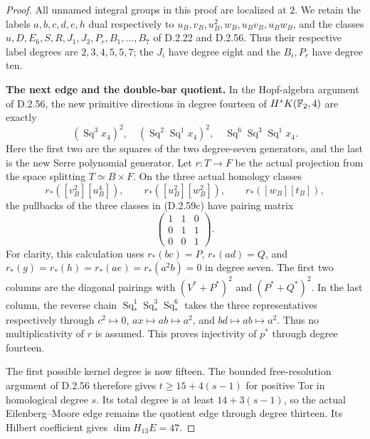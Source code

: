 \begin{proof}
All unnamed integral groups in this proof are localized at $2$.
We retain the labels $a,b,c,d,e,h$ dual respectively to
$u_B,v_B,u_B^2,w_B,u_Bv_B,u_Bw_B$, and the classes
$u,D,E_6,S,R,J_1,J_2,P_r,B_1,\ldots,B_7$ of D.2.22 and
D.2.56.  Thus their respective label degrees are
$2,3,4,5,5,7$; the $J_i$ have degree eight and the $B_i,P_r$
have degree ten.

\textbf{The next edge and the double-bar quotient.}
In the Hopf-algebra argument of D.2.56, the new primitive directions
in degree fourteen of $H^*K(\mathbb F_2,4)$ are exactly
\[
 (\operatorname{Sq}^3x_4)^2,\quad
 (\operatorname{Sq}^2\operatorname{Sq}^1x_4)^2,\quad
 \operatorname{Sq}^6\operatorname{Sq}^3\operatorname{Sq}^1x_4.
 \tag{D.2.59c}
\]
Here the first two are the squares of the two degree-seven
generators, and the last is the new Serre polynomial generator.
Let $r:T\to F$ be the actual projection from the space splitting
$T\simeq B\times F$.  On the three actual homology classes
\[
 r_*([v_B^2][u_B^4]),\qquad
 r_*([u_B^2][w_B^2]),\qquad r_*([w_B][t_B]),
\]
the pullbacks of the three classes in \textup{(D.2.59c)} have
pairing matrix
\[
 \begin{pmatrix}1&1&0\\0&1&1\\0&0&1\end{pmatrix}.
 \tag{D.2.59d}
\]
For clarity, this calculation uses $r_*(bc)=P$, $r_*(ad)=Q$,
and $r_*(g)=r_*(h)=r_*(ae)=r_*(a^2b)=0$ in degree seven.
The first two columns are the diagonal pairings with
$(V^*+P^*)^2$ and $(P^*+Q^*)^2$.  In the last column, the reverse
chain $\operatorname{Sq}_*^1\operatorname{Sq}_*^3
\operatorname{Sq}_*^6$ takes the three representatives respectively
through $c^2\mapsto0$, $ax\mapsto ab\mapsto a^2$, and
$bd\mapsto ab\mapsto a^2$.  Thus no multiplicativity of $r$ is
assumed.  This proves injectivity of $p^*$ through degree fourteen.

The first possible kernel degree is now fifteen.  The bounded
free-resolution argument of D.2.56 therefore gives
$t\geq15+4(s-1)$ for positive Tor in homological degree $s$.
Its total degree is at least $14+3(s-1)$, so the actual
Eilenberg--Moore edge remains the quotient edge through degree
thirteen.  Its Hilbert coefficient gives $\dim H_{13}E=47$.


\end{proof}

